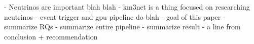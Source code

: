 


\begin{abstracts}        %

  - Neutrinos are important blah blah
  - km3net is a thing focused on researching neutrinos
  - event trigger and gpu pipeline do blah
  - goal of this paper
  - summarize RQs
  - summarize entire pipeline
  - summarize result
  - a line from conclusion + recommendation
\end{abstracts}


